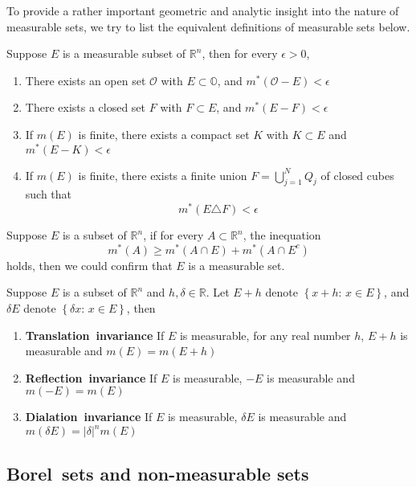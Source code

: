 \documentclass{ctexbook}
\begin{document}
To provide a rather important geometric and analytic insight into the nature of measurable sets, we try to list the
equivalent definitions of measurable sets below.
\begin{thm}
    Suppose $E$ is a measurable subset of $\mathbb{R}^n$, then for every $\epsilon>0$,
    \begin{enumerate}
        \item There exists an open set $\mathcal{O}$ with $E \subset \mathbb{O}$, and $m^*(\mathcal{O} - E) < \epsilon$
        \item There exists a closed set $F$ with $F \subset E$, and $m^*(E-F)<\epsilon$
        \item If $m(E)$ is finite, there exists a compact set $K$ with $K \subset E$ and $m^*(E-K) < \epsilon$
        \item If $m(E)$ is finite, there exists a finite union $F=\bigcup\limits_{j=1}^N Q_j$ of closed cubes such that \[m^*(E\triangle F)<\epsilon\]
    \end{enumerate}
\end{thm}
\begin{thm}
    Suppose $E$ is a subset of $\mathbb{R}^n$, if for every $A\subset \mathbb{R}^n$, the inequation
    \[m^*(A) \geq m^*(A\cap E)+m^*(A\cap E^c)\]
    holds, then we could confirm that $E$ is a measurable set.
\end{thm}

\begin{thm}
    Suppose $E$ is a subset of $\mathbb{R}^n $ and $h,\delta \in \mathbb{R}$. Let $E+h$ denote $\left\{x+h:\, x\in E\right\}$, and
    $\delta E$ denote $\left\{\delta x:\, x\in E\right\} $, then
    \begin{enumerate}
        \item \textbf{Translation~invariance} If $E$ is measurable, for any real number $h$, $E+h$ is measurable and $m(E) = m(E+h)$
        \item \textbf{Reflection~invariance} If $E$ is measurable, $-E$ is measurable and $m(-E) = m(E)$
        \item \textbf{Dialation~invariance} If $E$ is measurable, $\delta E$ is measurable and $m(\delta E) = \left\lvert\delta \right\rvert^nm(E)$
    \end{enumerate}
\end{thm}

\subsection*{Borel~sets and non-measurable sets}
\end{document}
